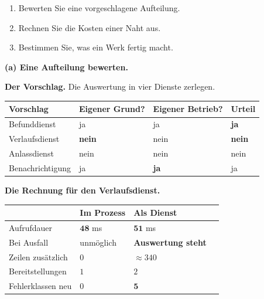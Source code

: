 \begin{aufgabe}
\begin{enumerate}[label=(\alph*)]
\item Bewerten Sie eine vorgeschlagene Aufteilung.
\item Rechnen Sie die Kosten einer Naht aus.
\item Bestimmen Sie, was ein Werk fertig macht.
\end{enumerate}

\loesung
\textbf{(a) Eine Aufteilung bewerten.}

\textbf{Der Vorschlag.} Die Auswertung in vier Dienste zerlegen.

\begin{center}
{\small
\renewcommand{\arraystretch}{1.45}
\begin{tabular}{@{}P{2.8cm}P{2.0cm}P{2.0cm}P{1.8cm}@{}}
\toprule
\textbf{Vorschlag} & \textbf{Eigener Grund?} & \textbf{Eigener Betrieb?} & \textbf{Urteil}\\
\midrule
Befunddienst & \textcolor{gruen}{ja} & \textcolor{gruen}{ja} & \textcolor{gruen}{\textbf{ja}}\\
Verlaufsdienst & \textcolor{akzent}{\textbf{nein}} & \textcolor{akzent}{nein} & \textcolor{akzent}{\textbf{nein}}\\
Anlassdienst & \textcolor{akzent}{nein} & \textcolor{akzent}{nein} & \textcolor{akzent}{nein}\\
Benachrichtigung & \textcolor{gruen}{ja} & \textcolor{gruen}{\textbf{ja}} & \textcolor{gruen}{ja}\\
\bottomrule
\end{tabular}}
\end{center}

\begin{center}
\begin{minipage}{0.88\textwidth}
\end{minipage}
\end{center}

\textbf{Die Rechnung für den Verlaufsdienst.}

\begin{center}
\renewcommand{\arraystretch}{1.45}
\begin{tabular}{@{}P{2.8cm}P{2.2cm}P{2.4cm}P{1.8cm}@{}}
\toprule
& \textbf{Im Prozess} & \textbf{Als Dienst} & \\
\midrule
Aufrufdauer & $\mathbf{48}$ ms & $\mathbf{51}$ ms & \\
Bei Ausfall & \textcolor{gruen}{unmöglich} & \textcolor{akzent}{\textbf{Auswertung steht}} & \\
Zeilen zusätzlich & $0$ & $\approx340$ & \\
Bereitstellungen & $1$ & $2$ & \\
Fehlerklassen neu & $0$ & $\mathbf{5}$ & \\
\bottomrule
\end{tabular}
\end{center}


\end{aufgabe}
